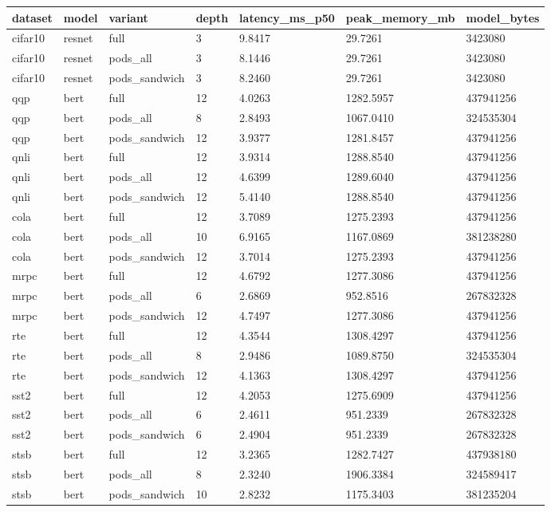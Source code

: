 \begin{tabular}{lllllll}
\hline
dataset & model & variant & depth & latency\_ms\_p50 & peak\_memory\_mb & model\_bytes \\
\hline
cifar10 & resnet & full & 3 & 9.8417 & 29.7261 & 3423080 \\
cifar10 & resnet & pods\_all & 3 & 8.1446 & 29.7261 & 3423080 \\
cifar10 & resnet & pods\_sandwich & 3 & 8.2460 & 29.7261 & 3423080 \\
qqp & bert & full & 12 & 4.0263 & 1282.5957 & 437941256 \\
qqp & bert & pods\_all & 8 & 2.8493 & 1067.0410 & 324535304 \\
qqp & bert & pods\_sandwich & 12 & 3.9377 & 1281.8457 & 437941256 \\
qnli & bert & full & 12 & 3.9314 & 1288.8540 & 437941256 \\
qnli & bert & pods\_all & 12 & 4.6399 & 1289.6040 & 437941256 \\
qnli & bert & pods\_sandwich & 12 & 5.4140 & 1288.8540 & 437941256 \\
cola & bert & full & 12 & 3.7089 & 1275.2393 & 437941256 \\
cola & bert & pods\_all & 10 & 6.9165 & 1167.0869 & 381238280 \\
cola & bert & pods\_sandwich & 12 & 3.7014 & 1275.2393 & 437941256 \\
mrpc & bert & full & 12 & 4.6792 & 1277.3086 & 437941256 \\
mrpc & bert & pods\_all & 6 & 2.6869 & 952.8516 & 267832328 \\
mrpc & bert & pods\_sandwich & 12 & 4.7497 & 1277.3086 & 437941256 \\
rte & bert & full & 12 & 4.3544 & 1308.4297 & 437941256 \\
rte & bert & pods\_all & 8 & 2.9486 & 1089.8750 & 324535304 \\
rte & bert & pods\_sandwich & 12 & 4.1363 & 1308.4297 & 437941256 \\
sst2 & bert & full & 12 & 4.2053 & 1275.6909 & 437941256 \\
sst2 & bert & pods\_all & 6 & 2.4611 & 951.2339 & 267832328 \\
sst2 & bert & pods\_sandwich & 6 & 2.4904 & 951.2339 & 267832328 \\
stsb & bert & full & 12 & 3.2365 & 1282.7427 & 437938180 \\
stsb & bert & pods\_all & 8 & 2.3240 & 1906.3384 & 324589417 \\
stsb & bert & pods\_sandwich & 10 & 2.8232 & 1175.3403 & 381235204 \\
\hline
\end{tabular}
